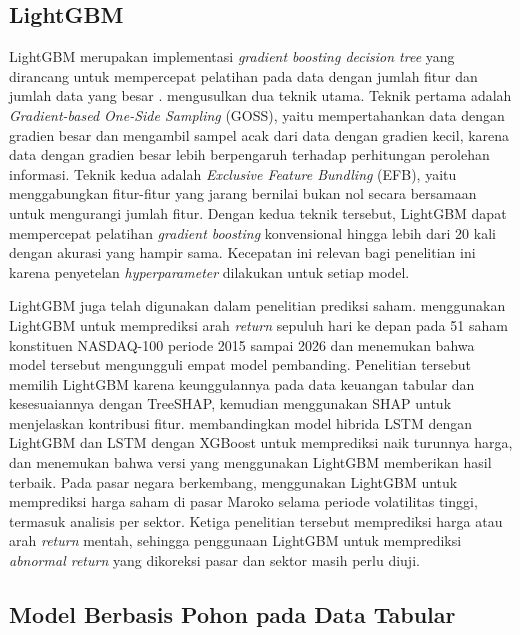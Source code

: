 \subsection{LightGBM}

LightGBM merupakan implementasi \emph{gradient boosting decision tree} yang dirancang untuk mempercepat pelatihan pada data dengan jumlah fitur dan jumlah data yang besar \autocite{ke2017}. \textcite{ke2017} mengusulkan dua teknik utama. Teknik pertama adalah \emph{Gradient-based One-Side Sampling} (GOSS), yaitu mempertahankan data dengan gradien besar dan mengambil sampel acak dari data dengan gradien kecil, karena data dengan gradien besar lebih berpengaruh terhadap perhitungan perolehan informasi. Teknik kedua adalah \emph{Exclusive Feature Bundling} (EFB), yaitu menggabungkan fitur-fitur yang jarang bernilai bukan nol secara bersamaan untuk mengurangi jumlah fitur. Dengan kedua teknik tersebut, LightGBM dapat mempercepat pelatihan \emph{gradient boosting} konvensional hingga lebih dari 20 kali dengan akurasi yang hampir sama. Kecepatan ini relevan bagi penelitian ini karena penyetelan \emph{hyperparameter} dilakukan untuk setiap model.

LightGBM juga telah digunakan dalam penelitian prediksi saham. \textcite{pagliaro2026} menggunakan LightGBM untuk memprediksi arah \emph{return} sepuluh hari ke depan pada 51 saham konstituen NASDAQ-100 periode 2015 sampai 2026 dan menemukan bahwa model tersebut mengungguli empat model pembanding. Penelitian tersebut memilih LightGBM karena keunggulannya pada data keuangan tabular dan kesesuaiannya dengan TreeSHAP, kemudian menggunakan SHAP untuk menjelaskan kontribusi fitur. \textcite{tian2022} membandingkan model hibrida LSTM dengan LightGBM dan LSTM dengan XGBoost untuk memprediksi naik turunnya harga, dan menemukan bahwa versi yang menggunakan LightGBM memberikan hasil terbaik. Pada pasar negara berkembang, \textcite{guennioui2024} menggunakan LightGBM untuk memprediksi harga saham di pasar Maroko selama periode volatilitas tinggi, termasuk analisis per sektor. Ketiga penelitian tersebut memprediksi harga atau arah \emph{return} mentah, sehingga penggunaan LightGBM untuk memprediksi \emph{abnormal return} yang dikoreksi pasar dan sektor masih perlu diuji.

\subsection{Model Berbasis Pohon pada Data Tabular}

